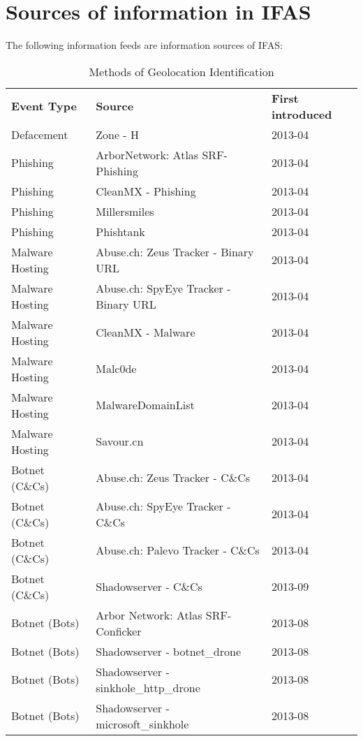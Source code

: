 
\FloatBarrier
\pagebreak
\appendix
\pagebreak
\section{Sources of information in IFAS}
The following information feeds are information sources of IFAS:
\begin{table}[!htbp]
\centering
\caption{Methods of Geolocation Identification}
\begin{tabular}{lll}
\hline
{\bf Event Type} & {\bf Source} & \bf First introduced \\\hhline{===}
Defacement & Zone - H & 2013-04
\\\hline
Phishing & ArborNetwork: Atlas SRF-Phishing & 2013-04
\\\hline
Phishing & CleanMX - Phishing & 2013-04
\\\hline
Phishing & Millersmiles & 2013-04
\\\hline
Phishing & Phishtank & 2013-04
\\\hline
Malware Hosting & Abuse.ch: Zeus Tracker - Binary URL & 2013-04
\\\hline
Malware Hosting & Abuse.ch: SpyEye Tracker - Binary URL & 2013-04
\\\hline
Malware Hosting & CleanMX - Malware & 2013-04
\\\hline
Malware Hosting & Malc0de & 2013-04
\\\hline
Malware Hosting & MalwareDomainList & 2013-04
\\\hline
Malware Hosting & Savour.cn & 2013-04
\\\hline
Botnet (C\&Cs) & Abuse.ch: Zeus Tracker - C\&Cs & 2013-04
\\\hline
Botnet (C\&Cs) & Abuse.ch: SpyEye Tracker - C\&Cs & 2013-04
\\\hline
Botnet (C\&Cs) & Abuse.ch: Palevo Tracker - C\&Cs & 2013-04
\\\hline
Botnet (C\&Cs) & Shadowserver - C\&Cs & 2013-09
\\\hline
Botnet (Bots) & Arbor Network: Atlas SRF-Conficker & 2013-08
\\\hline
Botnet (Bots) & Shadowserver - botnet\_drone & 2013-08
\\\hline
Botnet (Bots) & Shadowserver - sinkhole\_http\_drone & 2013-08
\\\hline
Botnet (Bots) & Shadowserver - microsoft\_sinkhole & 2013-08
\\\hline
\end{tabular}
\end{table}

